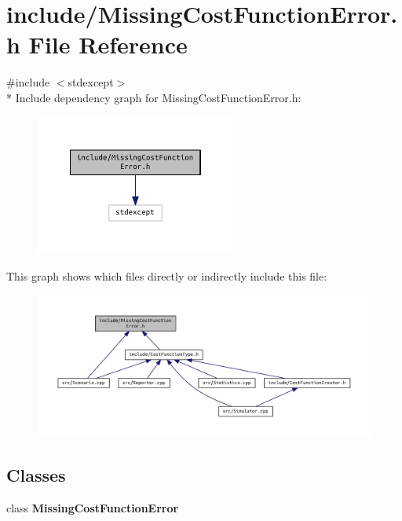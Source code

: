 \section{include/\+Missing\+Cost\+Function\+Error.h File Reference}
\label{_missing_cost_function_error_8h}
{\ttfamily \#include $<$stdexcept$>$}\\*
Include dependency graph for Missing\+Cost\+Function\+Error.\+h\+:\nopagebreak
\begin{figure}[H]
\begin{center}
\leavevmode
\includegraphics[width=187pt]{_missing_cost_function_error_8h__incl}
\end{center}
\end{figure}
This graph shows which files directly or indirectly include this file\+:\nopagebreak
\begin{figure}[H]
\begin{center}
\leavevmode
\includegraphics[width=350pt]{_missing_cost_function_error_8h__dep__incl}
\end{center}
\end{figure}
\subsection*{Classes}
\begin{DoxyCompactItemize}
\item 
class {\bf Missing\+Cost\+Function\+Error}
\end{DoxyCompactItemize}
